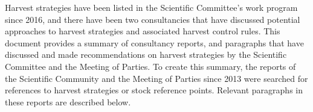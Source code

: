 Harvest strategies have been listed in the Scientific Committee’s work program since 2016, and there have been two consultancies that have discussed potential approaches to harvest strategies and associated harvest control rules.
This document provides a summary of consultancy reports, and paragraphs that have discussed and made recommendations on harvest strategies by the Scientific Committee and the Meeting of Parties. 
To create this summary, the reports of the Scientific Community and the Meeting of Parties since 2013 were searched for references to harvest strategies or stock reference points. Relevant paragraphs in these reports are described below.
